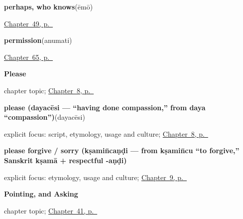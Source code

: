 \noindent\begin{minipage}[t]{\linewidth}
\raggedright
\textbf{perhaps, who knows}\enspace\emph{}\enspace(ēmō)\par
\footnotesize \hyperref[ch:te-replies]{Chapter~49, p.~\pageref*{ch:te-replies}}
\end{minipage}\par\smallskip

\noindent\begin{minipage}[t]{\linewidth}
\raggedright
\textbf{permission}\enspace\emph{}\enspace(anumati)\par
\footnotesize \hyperref[ch:te-more-manners]{Chapter~65, p.~\pageref*{ch:te-more-manners}}
\end{minipage}\par\smallskip

\noindent\begin{minipage}[t]{\linewidth}
\raggedright
\textbf{Please}\par
\footnotesize chapter topic; \hyperref[ch:te-please]{Chapter~8, p.~\pageref*{ch:te-please}}
\end{minipage}\par\smallskip

\noindent\begin{minipage}[t]{\linewidth}
\raggedright
\textbf{please (dayacēsi — \textquotedblleft{}having done compassion,\textquotedblright{} from  daya \textquotedblleft{}compassion\textquotedblright{})}\enspace\emph{}\enspace(dayacēsi)\par
\footnotesize explicit focus: script, etymology, usage and culture; \hyperref[ch:te-please]{Chapter~8, p.~\pageref*{ch:te-please}}
\end{minipage}\par\smallskip

\noindent\begin{minipage}[t]{\linewidth}
\raggedright
\textbf{please forgive / sorry (kṣamin̄caṇḍi — from kṣamin̄cu \textquotedblleft{}to forgive,\textquotedblright{} Sanskrit kṣamā + respectful -aṇḍi)}\enspace\emph{}\par
\footnotesize explicit focus: etymology, usage and culture; \hyperref[ch:te-sorry]{Chapter~9, p.~\pageref*{ch:te-sorry}}
\end{minipage}\par\smallskip

\noindent\begin{minipage}[t]{\linewidth}
\raggedright
\textbf{Pointing, and Asking}\par
\footnotesize chapter topic; \hyperref[ch:te-pointing-and-asking]{Chapter~41, p.~\pageref*{ch:te-pointing-and-asking}}
\end{minipage}\par\smallskip

